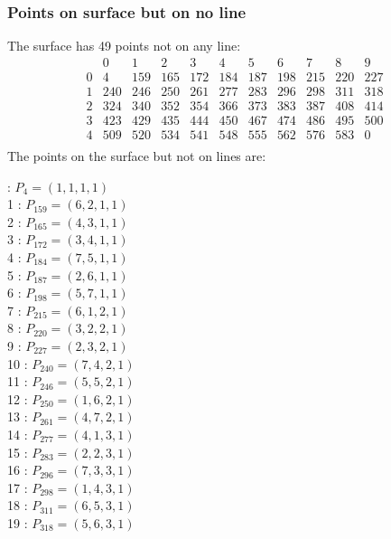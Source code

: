 \documentclass{article}
\begin{document}
{\subsubsection*{Points on surface but on no line}
The surface has 49 points not on any line:\\
$$
\begin{array}{r|*{10}{r}}
 & 0 & 1 & 2 & 3 & 4 & 5 & 6 & 7 & 8 & 9\\
\hline
0 & 4 & 159 & 165 & 172 & 184 & 187 & 198 & 215 & 220 & 227\\
1 & 240 & 246 & 250 & 261 & 277 & 283 & 296 & 298 & 311 & 318\\
2 & 324 & 340 & 352 & 354 & 366 & 373 & 383 & 387 & 408 & 414\\
3 & 423 & 429 & 435 & 444 & 450 & 467 & 474 & 486 & 495 & 500\\
4 & 509 & 520 & 534 & 541 & 548 & 555 & 562 & 576 & 583 & 0\\
\end{array}
$$
The points on the surface but not on lines are:\\
\begin{multicols}{2}
 : $P_{4}=( 1, 1, 1, 1 )$\\
1 : $P_{159}=( 6, 2, 1, 1 )$\\
2 : $P_{165}=( 4, 3, 1, 1 )$\\
3 : $P_{172}=( 3, 4, 1, 1 )$\\
4 : $P_{184}=( 7, 5, 1, 1 )$\\
5 : $P_{187}=( 2, 6, 1, 1 )$\\
6 : $P_{198}=( 5, 7, 1, 1 )$\\
7 : $P_{215}=( 6, 1, 2, 1 )$\\
8 : $P_{220}=( 3, 2, 2, 1 )$\\
9 : $P_{227}=( 2, 3, 2, 1 )$\\
10 : $P_{240}=( 7, 4, 2, 1 )$\\
11 : $P_{246}=( 5, 5, 2, 1 )$\\
12 : $P_{250}=( 1, 6, 2, 1 )$\\
13 : $P_{261}=( 4, 7, 2, 1 )$\\
14 : $P_{277}=( 4, 1, 3, 1 )$\\
15 : $P_{283}=( 2, 2, 3, 1 )$\\
16 : $P_{296}=( 7, 3, 3, 1 )$\\
17 : $P_{298}=( 1, 4, 3, 1 )$\\
18 : $P_{311}=( 6, 5, 3, 1 )$\\
19 : $P_{318}=( 5, 6, 3, 1 )$\\

\end{multicols}}
\end{document}
